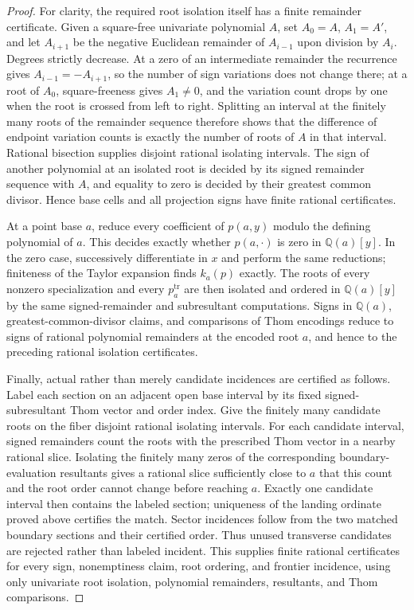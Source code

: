 \documentclass{article}
\begin{document}
\begin{proof}
For clarity, the required root isolation itself has a finite remainder certificate.  Given a square-free univariate polynomial \(A\), set \(A_0=A\), \(A_1=A'\), and let \(A_{i+1}\) be the negative Euclidean remainder of \(A_{i-1}\) upon division by \(A_i\).  Degrees strictly decrease.  At a zero of an intermediate remainder the recurrence gives \(A_{i-1}=-A_{i+1}\), so the number of sign variations does not change there; at a root of \(A_0\), square-freeness gives \(A_1\neq0\), and the variation count drops by one when the root is crossed from left to right.  Splitting an interval at the finitely many roots of the remainder sequence therefore shows that the difference of endpoint variation counts is exactly the number of roots of \(A\) in that interval.  Rational bisection supplies disjoint rational isolating intervals.  The sign of another polynomial at an isolated root is decided by its signed remainder sequence with \(A\), and equality to zero is decided by their greatest common divisor.  Hence base cells and all projection signs have finite rational certificates.

At a point base \(a\), reduce every coefficient of \(p(a,y)\) modulo the defining polynomial of \(a\).  This decides exactly whether \(p(a,\cdot)\) is zero in \(\mathbb Q(a)[y]\).  In the zero case, successively differentiate in \(x\) and perform the same reductions; finiteness of the Taylor expansion finds \(k_a(p)\) exactly.  The roots of every nonzero specialization and every \(p_a^{\mathrm{tr}}\) are then isolated and ordered in \(\mathbb Q(a)[y]\) by the same signed-remainder and subresultant computations.  Signs in \(\mathbb Q(a)\), greatest-common-divisor claims, and comparisons of Thom encodings reduce to signs of rational polynomial remainders at the encoded root \(a\), and hence to the preceding rational isolation certificates.

Finally, actual rather than merely candidate incidences are certified as follows.  Label each section on an adjacent open base interval by its fixed signed-subresultant Thom vector and order index.  Give the finitely many candidate roots on the fiber disjoint rational isolating intervals.  For each candidate interval, signed remainders count the roots with the prescribed Thom vector in a nearby rational slice.  Isolating the finitely many zeros of the corresponding boundary-evaluation resultants gives a rational slice sufficiently close to \(a\) that this count and the root order cannot change before reaching \(a\).  Exactly one candidate interval then contains the labeled section; uniqueness of the landing ordinate proved above certifies the match.  Sector incidences follow from the two matched boundary sections and their certified order.  Thus unused transverse candidates are rejected rather than labeled incident.  This supplies finite rational certificates for every sign, nonemptiness claim, root ordering, and frontier incidence, using only univariate root isolation, polynomial remainders, resultants, and Thom comparisons.


\end{proof}
\end{document}
